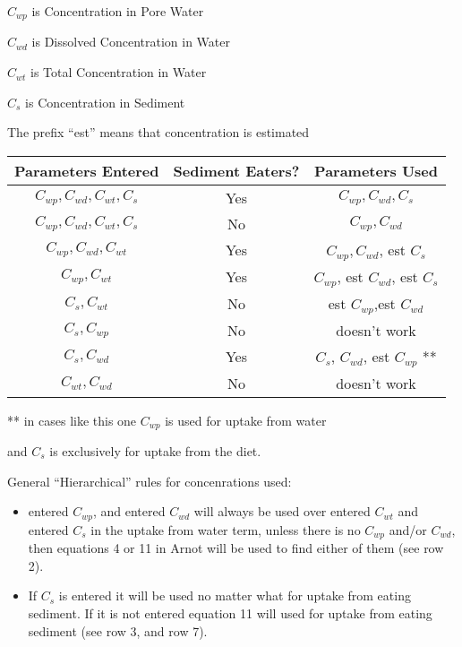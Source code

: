 \documentclass{article}
\begin{document}
$C_{wp}$ is Concentration in Pore Water

$C_{wd}$ is Dissolved Concentration in Water

$C_{wt}$ is Total Concentration in Water

$C_{s}$ is Concentration in Sediment

The prefix ``est'' means that concentration is estimated

\begin{table}[!th]
  \begin{tabular}{|c|c|c|}
    \hline
    Parameters Entered & Sediment Eaters? & Parameters Used  \\
    \hline
    $C_{wp}, C_{wd}, C_{wt}, C_{s}$ & Yes & $C_{wp}, C_{wd}, C_{s}$ \\
    \hline
    $C_{wp}, C_{wd}, C_{wt}, C_{s}$ & No & $C_{wp}, C_{wd}$ \\
    \hline
    $C_{wp}, C_{wd}, C_{wt}$ & Yes & $C_{wp}, C_{wd}$, est $C_s$ \\
    \hline
    $C_{wp}, C_{wt}$ & Yes & $C_{wp}$, est $C_{wd}$, est $C_{s}$ \\
    \hline 
    $C_{s}, C_{wt}$ & No & est $C_{wp}$,est $C_{wd}$ \\
    \hline
    $C_{s}, C_{wp}$ & No & doesn't work \\
    \hline
    $C_{s}, C_{wd}$ & Yes & $C_{s}$, $C_{wd}$, est $C_{wp}$ ** \\
    \hline
    $C_{wt}, C_{wd}$ & No & doesn't work \\
    \hline
  \end{tabular}
\end{table}

** in cases like this one $C_{wp}$ is used for uptake from water

and $C_{s}$ is exclusively for uptake from the diet.

\vspace{5mm}

General ``Hierarchical'' rules for concenrations used:

\begin{itemize}
\item entered $C_{wp}$, and entered $C_{wd}$ will always be used over entered $C_{wt}$ and entered $C_{s}$ in the uptake from water term, unless there is no  $C_{wp}$ and/or $C_{wd}$, then equations 4 or 11 in Arnot will be used to find either of them (see row 2).
\item If $C_s$ is entered it will be used no matter what for uptake from eating sediment. If it is not entered equation 11 will used for uptake from eating sediment (see row 3, and row 7).

\end{itemize}
\end{document}
